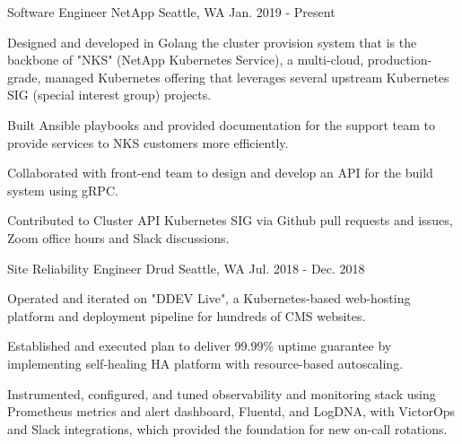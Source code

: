 


\begin{cventries}


\cventry
{Software Engineer} %
{NetApp} %
{Seattle, WA} %
{Jan. 2019 - Present} %
{ %
\begin{cvitems}
\item {Designed and developed in Golang the cluster provision system that is the backbone of "NKS" (NetApp Kubernetes Service), a multi-cloud, production-grade, managed Kubernetes offering that leverages several upstream Kubernetes SIG (special interest group) projects.}
\item {Built Ansible playbooks and provided documentation for the support team to provide services to NKS customers more efficiently.}
\item {Collaborated with front-end team to design and develop an API for the build system using gRPC.}
\item {Contributed to Cluster API Kubernetes SIG via Github pull requests and issues, Zoom office hours and Slack discussions.}
\end{cvitems}
}


\cventry
{Site Reliability Engineer} %
{Drud} %
{Seattle, WA} %
{Jul. 2018 - Dec. 2018} %
{ %
\begin{cvitems}
\item {Operated and iterated on "DDEV Live", a Kubernetes-based web-hosting platform and deployment pipeline for hundreds of CMS websites.}
\item {Established and executed plan to deliver 99.99\% uptime guarantee by implementing self-healing HA platform with resource-based autoscaling.}
\item {Instrumented, configured, and tuned observability and monitoring stack using Prometheus metrics and alert dashboard, Fluentd, and LogDNA, with VictorOps and Slack integrations, which provided the foundation for new on-call rotations.}
\end{cvitems}
}


\end{cventries}
